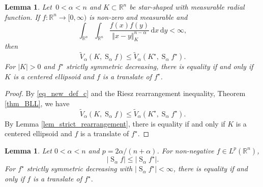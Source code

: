 \documentclass{amsart}
\newtheorem{lemma}[theorem]{Lemma}
\newcommand{\R}{\mathbb R}
\renewcommand{\d}{\,\mathrm{d}}
\newcommand{\vol}[1]{\vert #1\vert}
\newcommand{\hls}[1]{\operatorname{S}_{#1}\!} %
\begin{document}
\begin{lemma}\label{lem_smooth_compact_support_Riesz}
Let  $\,0<\alpha<n$ and $K\subset\R^n$ be star-shaped with measurable radial function. If  $
f:\R^n\to[0,\infty)$ is non-zero and measurable
 and
\begin{equation}
\int_{\R^n}\int_{\R^n} \frac{f(x) f(y)}{\Vert x-y\Vert_K^{n-\alpha}} \d x \d y<\infty,
\end{equation}
then
\begin{equation}
\tilde V_\alpha(K, \hls\alpha f) \leq \tilde V_\alpha(K^\star, \hls\alpha f^\star).
\end{equation}
For $\vol{K}>0$ and $f^\star$ strictly symmetric decreasing, there is equality if and only if $K$ is a centered ellipsoid and $f$ is a translate of $f^\star$.
\end{lemma}

\goodbreak
\begin{proof}
By \eqref{eq_new_def_c} and the Riesz rearrangement inequality, Theorem \ref{thm_BLL}, we have
\[\tilde V_\alpha(K, \hls\alpha f) \leq \tilde V_\alpha(K^\star, \hls\alpha f^\star).\]
By Lemma \ref{lem_strict_rearrangement}, there is equality if and only if $K$ is a centered ellipsoid and $f$ is a translate of $f^\star$.
\end{proof}

\goodbreak
\begin{lemma}\label{lem_new_rearrangement}
Let $0<\alpha<n$ and $p=2\alpha/(n+\alpha)$.
For non-negative $f\in L^p(\R^n)$, 
	\begin{equation}
	\vol{\hls\alpha f} \leq \vol{\hls\alpha f^\star}.
	\end{equation}
For $f^\star$ strictly symmetric decreasing with $\vol{\hls \alpha f^\star}<\infty$,
there is equality if and only if $f$ is a translate of $f^\star$.
\end{lemma}
\end{document}
